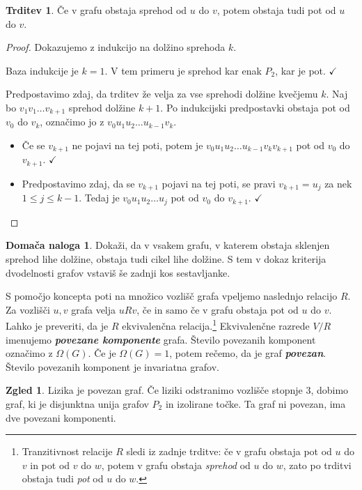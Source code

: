 \documentclass[11pt]{book}
\def\definicija{\color{rdeca}\bf\em}
\def\kljuka{$\checkmark$}
\theoremstyle{definition}
\theoremstyle{zgled}
\newtheorem*{zgled}{Zgled}
\theoremstyle{odprtproblem}
\theoremstyle{domacanaloga}
\newtheorem*{domacanaloga}{Domača naloga}
\newenvironment{dokaz}
    {\color{siva}\begin{proof}}
    {\end{proof}}
\theoremstyle{izrek}
\newtheorem*{trditev}{Trditev}
\begin{document}
\begin{trditev}
Če v grafu obstaja sprehod od $u$ do $v$, potem obstaja tudi pot od $u$ do $v$.
\end{trditev}
\begin{dokaz}
Dokazujemo z indukcijo na dolžino sprehoda $k$.

Baza indukcije je $k = 1$. V tem primeru je sprehod kar enak $P_2$, kar je pot. \kljuka

Predpostavimo zdaj, da trditev že velja za vse sprehodi dolžine kvečjemu $k$. Naj bo $v_1 v_1 \dots v_{k+1}$ sprehod dolžine $k+1$. Po indukcijski predpostavki obstaja pot od $v_0$ do $v_k$, označimo jo z $v_0 u_1 u_2 \dots u_{k-1} v_k$. 

\begin{itemize}
    \item Če se $v_{k+1}$ ne pojavi na tej poti, potem je $v_0 u_1 u_2 \dots u_{k-1} v_k v_{k+1}$ pot od $v_0$ do $v_{k+1}$. \kljuka
    \item Predpostavimo zdaj, da se $v_{k+1}$ pojavi na tej poti, se pravi $v_{k+1} = u_j$ za nek $1 \leq j \leq k-1$. Tedaj je $v_0 u_1 u_2 \dots u_j$ pot od $v_0$ do $v_{k+1}$. \kljuka
\end{itemize}
\end{dokaz}

\begin{domacanaloga}
Dokaži, da v vsakem grafu, v katerem obstaja sklenjen sprehod lihe dolžine, obstaja tudi cikel lihe dolžine. S tem v dokaz kriterija dvodelnosti grafov vstaviš še zadnji kos sestavljanke.
\end{domacanaloga}

S pomočjo koncepta poti na množico vozlišč grafa vpeljemo naslednjo relacijo $R$. Za vozlišči $u,v$ grafa velja $u R v$, če in samo če v grafu obstaja pot od $u$ do $v$. Lahko je preveriti, da je $R$ ekvivalenčna relacija.\footnote{Tranzitivnost relacije $R$ sledi iz zadnje trditve: če v grafu obstaja pot od $u$ do $v$ in pot od $v$ do $w$, potem v grafu obstaja \emph{sprehod} od $u$ do $w$, zato po trditvi obstaja tudi \emph{pot} od $u$ do $w$.} Ekvivalenčne razrede $V/R$ imenujemo {\definicija povezane komponente} grafa. Število povezanih komponent označimo z $\Omega(G)$. Če je $\Omega(G) = 1$, potem rečemo, da je graf {\definicija povezan}. Število povezanih komponent je invariatna grafov.

\begin{zgled}
Lizika je povezan graf. Če liziki odstranimo vozlišče stopnje $3$, dobimo graf, ki je disjunktna unija grafov $P_2$ in izolirane točke. Ta graf ni povezan, ima dve povezani komponenti.
\end{zgled}
\end{document}
